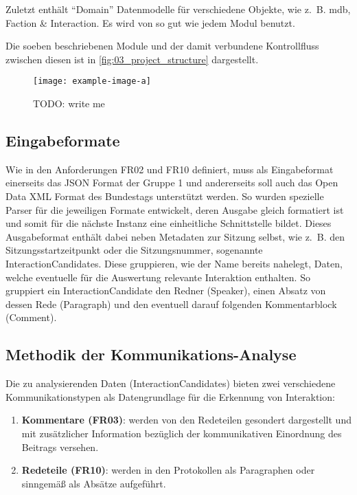 Zuletzt enthält \enquote{Domain} Datenmodelle für verschiedene Objekte, wie z.~B. \gls{mdb},
Faction \& Interaction. Es wird von so gut wie jedem Modul benutzt.

Die soeben beschriebenen Module und der damit verbundene Kontrollfluss zwischen
diesen ist in \autoref{fig:03_project_structure} dargestellt.

\begin{figure}
    \begin{center}
        \texttt{[image: example-image-a]}
    \end{center}
    \caption{TODO: write me}
    \label{fig:03_project_structure}
\end{figure}

\subsection{Eingabeformate}
Wie in den Anforderungen FR02 und FR10 definiert, muss als Eingabeformat
einerseits das JSON Format der Gruppe 1 und andererseits soll auch das
Open Data XML Format des Bundestags unterstützt werden. So wurden
spezielle Parser für die jeweiligen Formate entwickelt, deren Ausgabe gleich
formatiert ist und somit für die nächste Instanz eine einheitliche
Schnittstelle bildet. Dieses Ausgabeformat enthält dabei neben Metadaten zur
Sitzung selbst, wie z.~B. den Sitzungsstartzeitpunkt oder die Sitzungsnummer,
sogenannte InteractionCandidates. Diese gruppieren, wie der Name bereits
nahelegt, Daten, welche eventuelle für die Auswertung relevante Interaktion
enthalten. So gruppiert ein InteractionCandidate den Redner (Speaker),
einen Absatz von dessen Rede (Paragraph) und den eventuell darauf folgenden
Kommentarblock (Comment).

\subsection{Methodik der Kommunikations-Analyse}
Die zu analysierenden Daten (InteractionCandidates) bieten zwei verschiedene
Kommunikationstypen als Datengrundlage für die Erkennung von Interaktion:

\begin{enumerate}
    \item \textbf{Kommentare (FR03)}: werden von den Redeteilen gesondert
        dargestellt und mit zusätzlicher Information bezüglich der
        kommunikativen Einordnung des Beitrags versehen.
    \item \textbf{Redeteile (FR10)}: werden in den Protokollen als
        Paragraphen oder sinngemäß als Absätze aufgeführt.
\end{enumerate}


